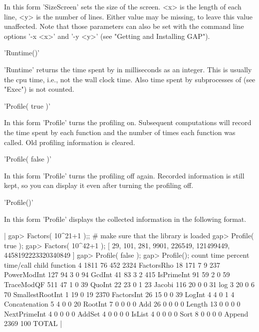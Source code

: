 In this form 'SizeScreen' sets the size of the screen.  <x> is the length
of  each line, <y> is the number of  lines.  Either value may be missing,
to leave  this value unaffected.  Note that those parameters can  also be
set with the command line options '-x <x>' and '-y <y>' (see "Getting and
Installing GAP").

%

'Runtime()'

'Runtime' returns the time spent by {\GAP} in milliseconds as an integer.
This is usually the cpu time,  i.e., not the  wall clock time.  Also time
spent by subprocesses of {\GAP} (see "Exec") is not counted.

%

'Profile( true )'

In this form 'Profile' turns  the  profiling on.  Subsequent computations
will record the time spent by each function and the number of  times each
function was called.  Old profiling information is cleared.

'Profile( false )'

In  this   form 'Profile' turns    the  profiling off  again.    Recorded
information is still kept, so you can  display it even  after turning the
profiling off.

'Profile()'

In   this  form 'Profile'  displays  the  collected  information   in the
following format.

|    gap> Factors( 10^21+1 );;    # make sure that the library is loaded
    gap> Profile( true );
    gap> Factors( 10^42+1 );
    [ 29, 101, 281, 9901, 226549, 121499449, 4458192223320340849 ]
    gap> Profile( false );
    gap> Profile();
     count    time percent time/call child function
         4    1811      76     452    2324  FactorsRho
        18     171       7       9     237  PowerModInt
       127      94       3       0      94  GcdInt
        41      83       3       2     415  IsPrimeInt
        91      59       2       0      59  TraceModQF
       511      47       1       0      39  QuoInt
        22      23       0       1      23  Jacobi
       116      20       0       0      31  log
         3      20       0       6      70  SmallestRootInt
         1      19       0      19    2370  FactorsInt
        26      15       0       0      39  LogInt
         4       4       0       1       4  Concatenation
         5       4       0       0      20  RootInt
         7       0       0       0       0  Add
        26       0       0       0       0  Length
        13       0       0       0       0  NextPrimeInt
         4       0       0       0       0  AddSet
         4       0       0       0       0  IsList
         4       0       0       0       0  Sort
         8       0       0       0       0  Append
              2369     100                  TOTAL |

